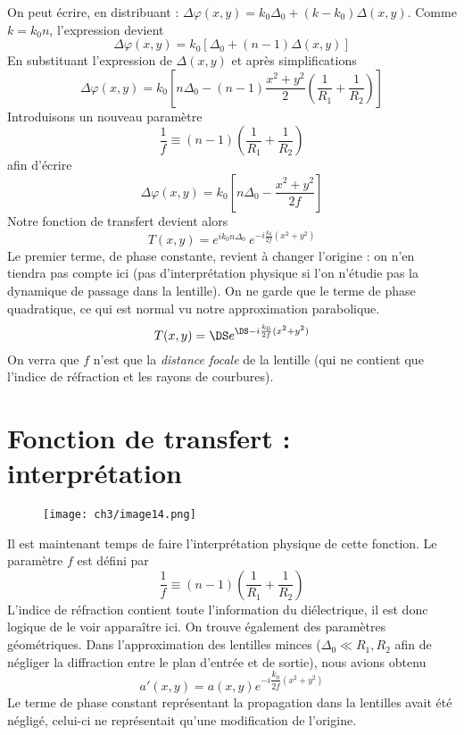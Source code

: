 	On peut écrire, en distribuant : $\Delta\varphi(x,y) = k_0\Delta_0 + (k-k_0)\Delta(x,y)$. Comme 
	$k=k_0n$, l'expression devient
	\begin{equation}
	\Delta\varphi(x,y) = k_0\left[\Delta_0+(n-1)\Delta(x,y)\right]
	\end{equation}
	En substituant l'expression de $\Delta(x,y)$ et après simplifications
	\begin{equation}
	\Delta \varphi(x,y) = k_0\left[n\Delta_0-(n-1)\dfrac{x^2+y^2}{2}\left(\dfrac{1}{R_1}+\dfrac{1}{R_2}\right)
	\right]
	\end{equation}
	Introduisons un nouveau paramètre
	\begin{equation}
	\frac{1}{f} \equiv (n-1)\left(\dfrac{1}{R_1}+\dfrac{1}{R_2}\right)
	\end{equation}
	afin d'écrire
	\begin{equation}
	\Delta\varphi(x,y) = k_0\left[n\Delta_0 - \dfrac{x^2+y^2}{2f}\right]
	\end{equation}
	Notre fonction de transfert devient alors
	\begin{equation}
	T(x,y) = e^{ik_0 n\Delta_0}\ e^{-i\frac{k_0}{2f}(x^2+y^2)}
	\end{equation}
	Le premier terme, de phase constante, revient à changer l'origine : on n'en tiendra pas compte ici (pas 
	d'interprétation physique si l'on n'étudie pas la dynamique de passage dans la lentille). On ne garde 
	que le terme de phase quadratique, ce qui est normal vu notre approximation parabolique. 
	\begin{equation}
	T(x,y) =\DS e^{\DS -i\frac{k_0}{2f}(x^2+y^2)}
	\end{equation}
	On verra que $f$ n'est que la \textit{distance focale} de la lentille (qui ne contient que l'indice de 
	réfraction et les rayons de courbures).

\newpage
\section{Fonction de transfert : interprétation}	
	\begin{wrapfigure}[10]{l}{7.4cm}
	\vspace{-5mm}
	\texttt{[image: ch3/image14.png]}
	\end{wrapfigure}		
Il est maintenant temps de faire l'interprétation physique de cette fonction. Le paramètre $f$ est défini 
par 
\begin{equation}
\frac{1}{f} \equiv (n-1)\left(\dfrac{1}{R_1}+\dfrac{1}{R_2}\right)
\end{equation}
L'indice de réfraction contient toute l'information du diélectrique, il est donc logique de le voir 
apparaître ici. On trouve également des paramètres géométriques.  Dans l'approximation des lentilles 
minces ($\Delta_0\ll R_1,R_2$ afin de négliger la diffraction entre le plan d'entrée et de sortie), nous 
avions obtenu
\begin{equation}
a'(x,y) = a(x,y)e^{-i\dfrac{k_0}{2f}(x^2+y^2)}
\end{equation}
Le terme de phase constant représentant la propagation dans la lentilles avait été négligé, celui-ci ne 
représentait qu'une modification de l'origine. \\

